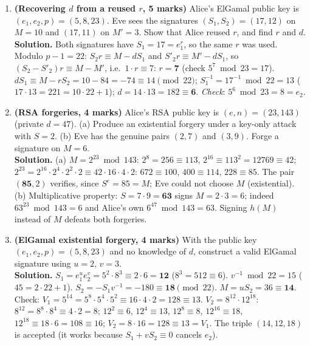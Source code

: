\begin{enumerate}[leftmargin=1.6em,itemsep=4pt]
  \item \textbf{(Recovering $d$ from a reused $r$, 5 marks)} Alice's ElGamal public key is $(e_1, e_2, p) = (5, 8, 23)$. Eve sees the signatures $(S_1, S_2) = (17, 12)$ on $M = 10$ and $(17, 11)$ on $M' = 3$. Show that Alice reused $r$, and find $r$ and $d$.\\
  \textbf{Solution.} Both signatures have $S_1 = 17 = e_1^r$, so the same $r$ was used. Modulo $p - 1 = 22$: $S_2 r \equiv M - dS_1$ and $S'_2 r \equiv M' - dS_1$, so $(S_2 - S'_2) r \equiv M - M'$, i.e.\ $1 \cdot r \equiv 7$: $r = \mathbf{7}$ (check $5^7 \bmod 23 = 17$).\\
  $d S_1 \equiv M - rS_2 = 10 - 84 = -74 \equiv 14 \pmod{22}$; $S_1^{-1} = 17^{-1} \bmod 22 = 13$ ($17 \cdot 13 = 221 = 10 \cdot 22 + 1$); $d = 14 \cdot 13 = 182 \equiv \mathbf{6}$. \emph{Check}: $5^6 \bmod 23 = 8 = e_2$.

  \item \textbf{(RSA forgeries, 4 marks)} Alice's RSA public key is $(e, n) = (23, 143)$ (private $d = 47$). (a) Produce an existential forgery under a key-only attack with $S = 2$. (b) Eve has the genuine pairs $(2, 7)$ and $(3, 9)$. Forge a signature on $M = 6$.\\
  \textbf{Solution.} (a) $M = 2^{23} \bmod 143$: $2^8 = 256 \equiv 113$, $2^{16} \equiv 113^2 = 12769 \equiv 42$; $2^{23} = 2^{16} \cdot 2^4 \cdot 2^2 \cdot 2 \equiv 42 \cdot 16 \cdot 4 \cdot 2$: $672 \equiv 100$, $400 \equiv 114$, $228 \equiv 85$. The pair $(\mathbf{85}, 2)$ verifies, since $S^e = 85 = M$; Eve could not choose $M$ (existential).\\
  (b) Multiplicative property: $S = 7 \cdot 9 = \mathbf{63}$ signs $M = 2 \cdot 3 = 6$; indeed $63^{23} \bmod 143 = 6$ and Alice's own $6^{47} \bmod 143 = 63$. Signing $h(M)$ instead of $M$ defeats both forgeries.

  \item \textbf{(ElGamal existential forgery, 4 marks)} With the public key $(e_1, e_2, p) = (5, 8, 23)$ and no knowledge of $d$, construct a valid ElGamal signature using $u = 2$, $v = 3$.\\
  \textbf{Solution.} $S_1 = e_1^u e_2^v = 5^2 \cdot 8^3 \equiv 2 \cdot 6 = \mathbf{12}$ ($8^3 = 512 \equiv 6$). $v^{-1} \bmod 22 = 15$ ($45 = 2 \cdot 22 + 1$). $S_2 = -S_1 v^{-1} = -180 \equiv \mathbf{18} \pmod{22}$. $M = u S_2 = 36 \equiv \mathbf{14}$.\\
  Check: $V_1 = 5^{14} = 5^8 \cdot 5^4 \cdot 5^2 \equiv 16 \cdot 4 \cdot 2 = 128 \equiv 13$. $V_2 = 8^{12} \cdot 12^{18}$: $8^{12} = 8^8 \cdot 8^4 \equiv 4 \cdot 2 = 8$; $12^2 \equiv 6$, $12^4 \equiv 13$, $12^8 \equiv 8$, $12^{16} \equiv 18$, $12^{18} \equiv 18 \cdot 6 = 108 \equiv 16$; $V_2 = 8 \cdot 16 = 128 \equiv 13 = V_1$. The triple $(14, 12, 18)$ is accepted (it works because $S_1 + vS_2 \equiv 0$ cancels $e_2$).


\end{enumerate}
